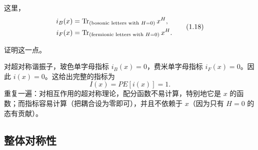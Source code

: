 这里，
\[
\begin{aligned}
i_B(x) &= \operatorname{Tr}_{(\text{bosonic letters with } H=0)} x^H ,\\
i_F(x) &= \operatorname{Tr}_{(\text{fermionic letters with } H=0)} x^H .
\end{aligned}
\tag{1.18}
\]
\begin{exercise}[1.1]
证明这一点。
\end{exercise}
对超对称谐振子，玻色单字母指标 $i_B(x) = 0$，费米单字母指标 $i_F(x) = 0$。因此 $i(x) = 0$。这给出完整的指标为
\[
I(x) = PE[i(x)] = 1 .
\tag{1.19}
\]
重复一遍：对相互作用的超对称理论，配分函数不易计算，特别地它是 $x$ 的函数；而指标容易计算（把耦合设为零即可），并且不依赖于 $x$（因为只有 $H=0$ 的态有贡献）。

\subsection{整体对称性}

